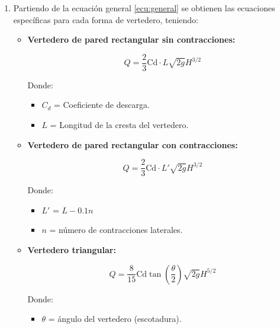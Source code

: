 \documentclass[10pt, a4paper]{exam}
\begin{document}
\begin{enumerate}

    \item Partiendo de la ecuación general \ref{ecu:general} se obtienen las ecuaciones específicas para cada forma de vertedero, teniendo:

    \begin{itemize}
        \item \textbf{Vertedero de pared rectangular sin contracciones:} 

        \begin{equation}
            Q = \frac{2}{3} \text{Cd} \cdot L \sqrt{2g}  H^{3/2} 
            \label{ecu:vertrect}
        \end{equation}

        Donde:  

        \begin{itemize}
            \item $C_d$ = Coeficiente de descarga.
            \item $L$ = Longitud de la cresta del vertedero.
        \end{itemize}

        \item \textbf{Vertedero de pared rectangular con contracciones:} 

        \begin{equation}
            Q = \frac{2}{3} \text{Cd} \cdot L' \sqrt{2g}H^{3/2}
        \end{equation}

        Donde:  

        \begin{itemize}
            \item $L'$ = $L-0.1n$
            \item $n$ = número de contracciones laterales.
        \end{itemize}

        \item \textbf{Vertedero triangular:} 

        \begin{equation}
            Q = \frac{8}{15} \text{Cd} \tan \left(\frac{\theta}{2}\right) \sqrt{2g}  H^{5/2}
        \end{equation}

        Donde:  

        \begin{itemize}
            \item $\theta$ = ángulo del vertedero (escotadura).
        \end{itemize}


\end{itemize}
\end{enumerate}
\end{document}
